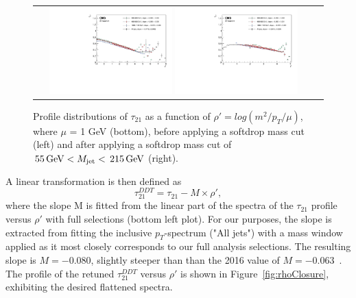 \begin{figure}[htbp]
\centering
\begin{tabular}{cc}
\includegraphics[width=0.45\textwidth]{figures/analysis/search3/AN-17-303/vtag/rho_pythia_rhoPrime.pdf}
\includegraphics[width=0.45\textwidth]{figures/analysis/search3/AN-17-303/vtag/rho_pythia_FullSel_rhoPrime.pdf}\\
\end{tabular}
\caption{Profile distributions of $\tau_{21}$ as a function of $\rho' = log(m^2/p_T/\mu)$, where $\mu$ = 1 GeV (bottom), before applying a softdrop mass cut (left) and after applying a softdrop mass cut of $\text{\,55}{\ensuremath{\,\text{Ge\hspace{-.08em}V}}} < M_{\rm jet} < \text{\,215}{\ensuremath{\,\text{Ge\hspace{-.08em}V}}}$ (right).}
\label{fig:rho}
\end{figure}
A linear transformation is then defined as
\begin{equation}
\label{eq:ddt}
\tau_{21}^{DDT}=\tau_{21}-M\times\rho',
\end{equation}
where the slope M is fitted from the linear part of the spectra of the $\tau_{21}$ profile versus $\rho'$ with full selections (bottom left plot). For our purposes, the slope is extracted from fitting the inclusive $p_T$-spectrum ("All jets") with a mass window applied
as it most closely corresponds to our full analysis selections. The resulting slope is $\ensuremath{M} = -0.080$, slightly steeper than than the 2016 value of $\ensuremath{M} = -0.063$~\cite{JME-16-003}.
The profile of the retuned $\tau_{21}^{DDT}$ versus $\rho'$ is shown in Figure~\ref{fig:rhoClosure}, exhibiting the desired flattened spectra.
